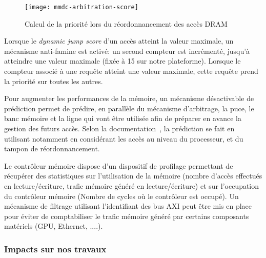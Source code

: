         \begin{figure}[!h]
            \centering
            \texttt{[image: mmdc-arbitration-score]}
            \caption{\label{fig:mmdc_score}Calcul de la priorité lors du réordonnancement des accès DRAM}
        \end{figure}

        Lorsque le \emph{dynamic jump score} d'un accès atteint la valeur maximale, un mécanisme anti-famine est activé: un second compteur est incrémenté, jusqu'à atteindre une valeur maximale (fixée à 15 sur notre plateforme). 
        Lorsque le compteur associé à une requête atteint une valeur maximale, cette requête prend la priorité sur toutes les autres.

        Pour augmenter les performances de la mémoire, un mécanisme désactivable de prédiction permet de prédire, en parallèle du mécanisme d'arbitrage, la puce, le banc mémoire et la ligne qui vont être utilisée afin de préparer en avance la gestion des futurs accès. Selon la documentation~\cite{mmdc_dbi}, la prédiction se fait en utilisant notamment en considérant les accès au niveau du processeur, et du tampon de réordonnancement.

        Le contrôleur mémoire dispose d'un dispositif de profilage permettant de récupérer des statistiques sur l'utilisation de la mémoire (nombre d'accès effectués en lecture/écriture, trafic mémoire généré en lecture/écriture) et sur l'occupation du contrôleur mémoire (Nombre de cycles où le contrôleur est occupé). Un mécanisme de filtrage utilisant l'identifiant des bus AXI peut être mis en place pour éviter de comptabiliser le trafic mémoire généré par certains composants matériels (GPU, Ethernet, ....).

        \subsubsection{Impacts sur nos travaux}



